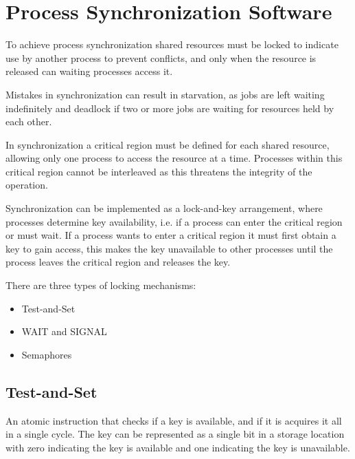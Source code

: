 \documentclass[12pt letter]{report}
\begin{document}
\section{Process Synchronization Software}


To achieve process synchronization shared resources must be locked to
indicate use by another process to prevent conflicts, and only when
the resource is released can waiting processes access it.

Mistakes in synchronization can result in starvation, as jobs are
left waiting indefinitely and deadlock if two or more jobs are
waiting for resources held by each other.

In synchronization a critical region must be defined for each shared
resource, allowing only one process to access the resource at a time.
Processes within this critical region cannot be interleaved as this
threatens the integrity of the operation.

Synchronization can be implemented as a lock-and-key arrangement,
where processes determine key availability, i.e. if a process can
enter the critical region or must wait. If a process wants to enter a
critical region it must first obtain a key to gain access, this makes
the key unavailable to other processes until the process leaves the
critical region and releases the key.

There are three types of locking mechanisms:
\begin{itemize}
  \item Test-and-Set
  \item WAIT and SIGNAL
  \item Semaphores
\end{itemize}

\subsection{Test-and-Set}


An atomic instruction that checks if a key is available, and if
it is acquires it all in a single cycle. The key can be represented
as a single bit in a storage location with zero indicating the key is
available and one indicating the key is unavailable.
\end{document}
